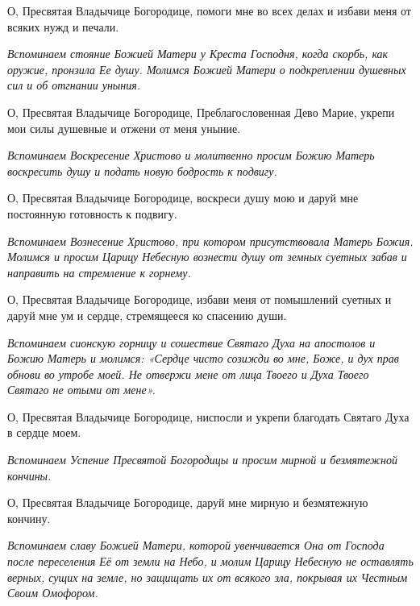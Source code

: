 \normalfont{}О, Пресвятая Владычице Богородице, помоги мне во всех делах и избави меня от всяких нужд и печали.




\itshape Вспоминаем стояние Божией Матери у Креста Господня, когда скорбь, как оружие, пронзила Ее душу. Молимся Божией Матери о подкреплении душевных сил и об отгнании уныния.

\normalfont{}О, Пресвятая Владычице Богородице, Преблагословенная Дево Марие, укрепи мои силы душевные и отжени от меня уныние.




\itshape Вспоминаем Воскресение Христово и молитвенно просим Божию Матерь воскресить душу и подать новую бодрость к подвигу.

\normalfont{}О, Пресвятая Владычице Богородице, воскреси душу мою и даруй мне постоянную готовность к подвигу.




\itshape Вспоминаем Вознесение Христово, при котором присутствовала Матерь Божия. Молимся и просим Царицу Небесную вознести душу от земных суетных забав и направить на стремление к горнему.

\normalfont{}О, Пресвятая Владычице Богородице, избави меня от помышлений суетных и даруй мне ум и сердце, стремящееся ко спасению души.




\itshape Вспоминаем сионскую горницу и сошествие Святаго Духа на апостолов и Божию Матерь и молимся: «Сердце чисто созижди во мне, Боже, и дух прав обнови во утробе моей. Не отвержи мене от лица Твоего и Духа Твоего Святаго не отыми от мене».

\normalfont{}О, Пресвятая Владычице Богородице, ниспосли и укрепи благодать Святаго Духа в сердце моем.




\itshape Вспоминаем Успение Пресвятой Богородицы и просим мирной и безмятежной кончины.

\normalfont{}О, Пресвятая Владычице Богородице, даруй мне мирную и безмятежную кончину.




\itshape Вспоминаем славу Божией Матери, которой увенчивается Она от Господа после переселения Её от земли на Небо, и молим Царицу Небесную не оставлять верных, сущих на земле, но защищать их от всякого зла, покрывая их Честным Своим Омофором.

